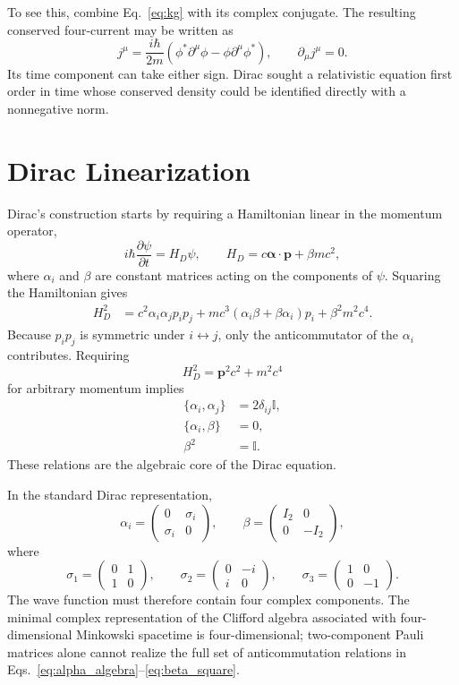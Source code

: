 \documentclass[12pt]{article}
\newcommand{\be}{\begin{equation}}
\newcommand{\ee}{\end{equation}}
\newcommand{\I}{\mathbb{I}}
\newcommand{\pder}[2]{\frac{\partial #1}{\partial #2}}
\numberwithin{equation}{section}
\begin{document}
To see this, combine Eq.~\eqref{eq:kg} with its complex conjugate. The resulting conserved four-current may be written as
\be
 j^\mu
 =\frac{i\hbar}{2m}
 \left(\phi^*\partial^\mu\phi-\phi\partial^\mu\phi^*\right),
 \qquad
 \partial_\mu j^\mu=0.
\label{eq:kg_current}
\ee
Its time component can take either sign. Dirac sought a relativistic equation first order in time whose conserved density could be identified directly with a nonnegative norm.

\section{Dirac Linearization}

Dirac's construction starts by requiring a Hamiltonian linear in the momentum operator,
\be
 i\hbar\pder{\psi}{t}=H_D\psi,
 \qquad
 H_D=c\boldsymbol{\alpha}\cdot\mathbf{p}+\beta mc^2,
\label{eq:dirac_hamiltonian}
\ee
where $\alpha_i$ and $\beta$ are constant matrices acting on the components of $\psi$. Squaring the Hamiltonian gives
\begin{align}
 H_D^2
 &=c^2\alpha_i\alpha_j p_i p_j
 +mc^3(\alpha_i\beta+\beta\alpha_i)p_i
 +\beta^2m^2c^4.\label{eq:dirac_squared}
\end{align}
Because $p_ip_j$ is symmetric under $i\leftrightarrow j$, only the anticommutator of the $\alpha_i$ contributes. Requiring
\be
 H_D^2=\mathbf{p}^2c^2+m^2c^4
\ee
for arbitrary momentum implies
\begin{align}
 \{\alpha_i,\alpha_j\}&=2\delta_{ij}\I,\label{eq:alpha_algebra}\\
 \{\alpha_i,\beta\}&=0,\label{eq:alpha_beta}\\
 \beta^2&=\I.\label{eq:beta_square}
\end{align}
These relations are the algebraic core of the Dirac equation.

In the standard Dirac representation,
\be
 \alpha_i=
 \begin{pmatrix}
 0&\sigma_i\\
 \sigma_i&0
 \end{pmatrix},
 \qquad
 \beta=
 \begin{pmatrix}
 I_2&0\\
 0&-I_2
 \end{pmatrix},
\label{eq:alpha_beta_standard}
\ee
where
\be
 \sigma_1=\begin{pmatrix}0&1\\1&0\end{pmatrix},\qquad
 \sigma_2=\begin{pmatrix}0&-i\\i&0\end{pmatrix},\qquad
 \sigma_3=\begin{pmatrix}1&0\\0&-1\end{pmatrix}.
\label{eq:pauli_matrices}
\ee
The wave function must therefore contain four complex components. The minimal complex representation of the Clifford algebra associated with four-dimensional Minkowski spacetime is four-dimensional; two-component Pauli matrices alone cannot realize the full set of anticommutation relations in Eqs.~\eqref{eq:alpha_algebra}--\eqref{eq:beta_square}.
\end{document}
